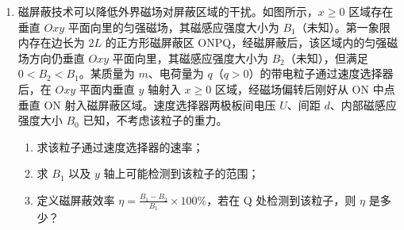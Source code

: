 \documentclass[\gkver]{gaokaozhenti}
\begin{document}
\begin{enumerate}
{$t_{2} = \frac{d}{v} + \frac{h}{v} = \frac{d}{\frac{c}{n}} + \frac{h}{\frac{c}{n}} = \frac{n(d + h)}{c}$

故 $t_{2} - t_{1} = \frac{(n - 1)h}{c} = \frac{0.5 \times 0.2 \times 10^{-3}}{3.0 \times 10^{8}} \Us \approx 3.3 \times 10^{-13} \Us$
}

\item
磁屏蔽技术可以降低外界磁场对屏蔽区域的干扰。如图所示，$x \geq 0$ 区域存在垂直 $Oxy$ 平面向里的匀强磁场，其磁感应强度大小为 $B_{1}$（未知）。第一象限内存在边长为 $2L$ 的正方形磁屏蔽区 ONPQ，经磁屏蔽后，该区域内的匀强磁场方向仍垂直 $Oxy$ 平面向里，其磁感应强度大小为 $B_{2}$（未知），但满足 $0 < B_{2} < B_{1}$。某质量为 $m$、电荷量为 $q$（$q > 0$）的带电粒子通过速度选择器后，在 $Oxy$ 平面内垂直 $y$ 轴射入 $x \geq 0$ 区域，经磁场偏转后刚好从 ON 中点垂直 ON 射入磁屏蔽区域。速度选择器两极板间电压 $U$、间距 $d$、内部磁感应强度大小 $B_{0}$ 已知，不考虑该粒子的重力。

\begin{enumerate}
\item
求该粒子通过速度选择器的速率；
\item
求 $B_{1}$ 以及 $y$ 轴上可能检测到该粒子的范围；
\item
定义磁屏蔽效率 $\eta = \frac{B_{1} - B_{2}}{B_{1}} \times 100\%$，若在 Q 处检测到该粒子，则 $\eta$ 是多少？
\end{enumerate}


\end{enumerate}
\end{document}
